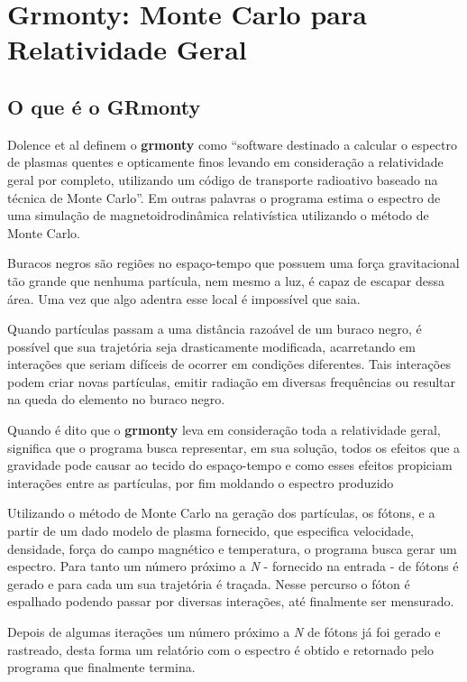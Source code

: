 \chapter{Grmonty: Monte Carlo para Relatividade Geral}
\label{cap:grmonty}

\section{O que é o GRmonty}
  Dolence et al definem o \textbf{grmonty} como ``software destinado a calcular o espectro de plasmas quentes e opticamente finos levando em consideração a relatividade geral por completo, utilizando um código de transporte radioativo baseado na técnica de Monte Carlo''\citep[p.1, traduzido]{Dolence:09}. Em outras palavras o programa estima o espectro de uma simulação de magnetoidrodinâmica \cite{eletro-hidro-dynamic:42} relativística utilizando o método de Monte Carlo.

  Buracos negros são regiões no espaço-tempo que possuem uma força gravitacional tão grande que nenhuma partícula, nem mesmo a luz, é capaz de escapar dessa área. Uma vez que algo adentra esse local é impossível que saia.

  Quando partículas passam a uma distância razoável de um buraco negro, é possível que sua trajetória seja drasticamente modificada, acarretando em interações que seriam difíceis de ocorrer em condições diferentes. Tais interações podem criar novas partículas, emitir radiação em diversas frequências ou resultar na queda do elemento no buraco negro.

  Quando é dito que o \textbf{grmonty} leva em consideração toda a relatividade geral, significa que o programa busca representar, em sua solução, todos os efeitos que a gravidade pode causar ao tecido do espaço-tempo e como esses efeitos propiciam interações entre as partículas, por fim moldando o espectro produzido

  Utilizando o método de Monte Carlo na geração dos partículas, os fótons, e a partir de um dado modelo de plasma fornecido, que especifica velocidade, densidade, força do campo magnético e temperatura, o programa busca gerar um espectro. Para tanto um número próximo a \textit{N} - fornecido na entrada - de fótons é gerado e para cada um sua trajetória é traçada. Nesse percurso o fóton é espalhado podendo passar por diversas interações, até finalmente ser mensurado.

  Depois de algumas iterações um número próximo a \textit{N} de fótons já foi gerado e rastreado, desta forma um relatório com o espectro é obtido e retornado pelo programa que finalmente termina.

